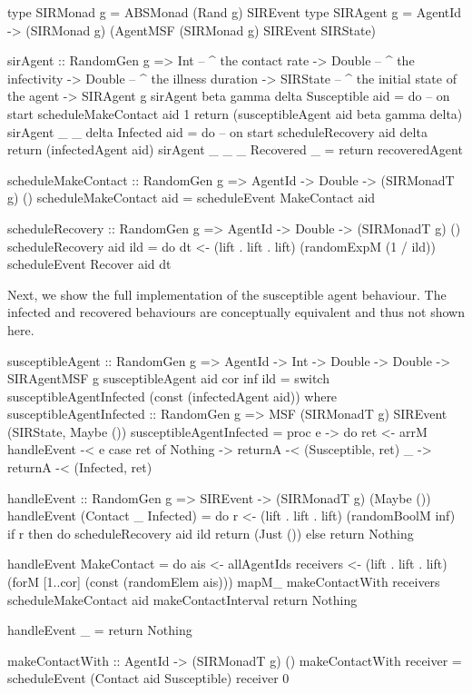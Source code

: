 \begin{HaskellCode}
type SIRMonad g = ABSMonad (Rand g) SIREvent
type SIRAgent g = AgentId -> (SIRMonad g) (AgentMSF (SIRMonad g) SIREvent SIRState)

sirAgent :: RandomGen g 
         => Int         -- ^ the contact rate
         -> Double      -- ^ the infectivity
         -> Double      -- ^ the illness duration
         -> SIRState    -- ^ the initial state of the agent
         -> SIRAgent g
sirAgent beta gamma delta Susceptible aid = do
  -- on start
  scheduleMakeContact aid 1
  return (susceptibleAgent aid beta gamma delta)
sirAgent _ _ delta Infected aid = do
  -- on start
  scheduleRecovery aid delta
  return (infectedAgent aid)
sirAgent _ _ _ Recovered _ = 
  return recoveredAgent

scheduleMakeContact :: RandomGen g => AgentId -> Double -> (SIRMonadT g) ()
scheduleMakeContact aid = scheduleEvent MakeContact aid

scheduleRecovery :: RandomGen g => AgentId -> Double -> (SIRMonadT g) ()
scheduleRecovery aid ild = do
  dt <- (lift . lift . lift) (randomExpM (1 / ild))
  scheduleEvent Recover aid dt
\end{HaskellCode}

Next, we show the full implementation of the susceptible agent behaviour. The infected and recovered behaviours are conceptually equivalent and thus not shown here.

\begin{HaskellCode}
susceptibleAgent :: RandomGen g 
                 => AgentId
                 -> Int
                 -> Double
                 -> Double
                 -> SIRAgentMSF g
susceptibleAgent aid cor inf ild = 
    switch
      susceptibleAgentInfected
      (const (infectedAgent aid))
  where
    susceptibleAgentInfected :: RandomGen g 
                             => MSF
                                (SIRMonadT g) 
                                SIREvent
                                (SIRState, Maybe ()) 
    susceptibleAgentInfected = proc e -> do
      ret <- arrM handleEvent -< e
      case ret of
        Nothing -> returnA -< (Susceptible, ret)
        _       -> returnA -< (Infected, ret)

    handleEvent :: RandomGen g => SIREvent -> (SIRMonadT g) (Maybe ())
    handleEvent (Contact _ Infected) = do
      r <- (lift . lift . lift) (randomBoolM inf)
      if r 
        then do
          scheduleRecovery aid ild
          return (Just ())
        else return Nothing

    handleEvent MakeContact = do
      ais       <- allAgentIds
      receivers <- (lift . lift . lift) (forM [1..cor] (const (randomElem ais)))
      mapM_ makeContactWith receivers
      scheduleMakeContact aid makeContactInterval
      return Nothing

    handleEvent _ = return Nothing

    makeContactWith :: AgentId -> (SIRMonadT g) ()
    makeContactWith receiver = 
      scheduleEvent (Contact aid Susceptible) receiver 0
\end{HaskellCode}

